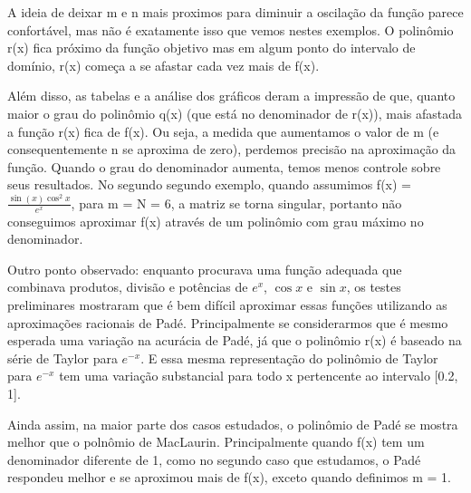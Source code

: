 \documentclass{article}
\begin{document}
    A ideia de deixar m e n mais proximos para diminuir a oscilação da função parece confortável,
    mas não é exatamente isso que vemos nestes exemplos.
    O polinômio r(x) fica próximo da função objetivo mas em algum ponto do intervalo de domínio,
    r(x) começa a se afastar cada vez mais de f(x).
    
    Além disso, as tabelas e a análise dos gráficos deram a impressão de que,
    quanto maior o grau do polinômio q(x) (que está no denominador de r(x)),
    mais afastada a função r(x) fica de f(x). Ou seja, a medida que aumentamos o valor de m
    (e consequentemente n se aproxima de zero), perdemos precisão na aproximação da função.
    Quando o grau do denominador aumenta, temos menos controle sobre seus resultados.
    No segundo segundo exemplo, quando assumimos f(x) = $\frac{\sin(x)\cos^{2}{x}}{e^{x}}$,
    para m = N = 6, a matriz se torna singular, portanto não conseguimos aproximar f(x) através de um polinômio
    com grau máximo no denominador.

    Outro ponto observado: enquanto procurava uma função adequada que combinava produtos, divisão e potências de
    $e^{x}$, $\cos{x}$ e $\sin{x}$, os testes preliminares mostraram que é bem difícil aproximar essas funções utilizando
    as aproximações racionais de Padé.
    Principalmente se considerarmos que é mesmo esperada uma variação na acurácia de Padé, já que o polinômio r(x) é baseado
    na série de Taylor para $e^{-x}$. E essa mesma representação do polinômio de Taylor para $e^{-x}$ tem uma variação substancial
    para todo x pertencente ao intervalo [0.2, 1].

    Ainda assim, na maior parte dos casos estudados, o polinômio de Padé se mostra melhor que o polnômio de MacLaurin.
    Principalmente quando f(x) tem um denominador diferente de 1, como no segundo caso que estudamos, o Padé respondeu
    melhor e se aproximou mais de f(x), exceto quando definimos m = 1.

    
\end{document}

